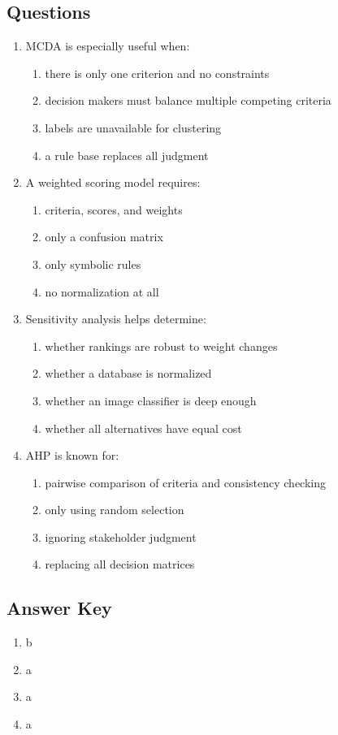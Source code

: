 \subsection*{Questions}
\begin{enumerate}[label=\textbf{Q\arabic*.}]
  \item MCDA is especially useful when:
  \begin{enumerate}[label=\alph*)]
    \item there is only one criterion and no constraints
    \item decision makers must balance multiple competing criteria
    \item labels are unavailable for clustering
    \item a rule base replaces all judgment
  \end{enumerate}

  \item A weighted scoring model requires:
  \begin{enumerate}[label=\alph*)]
    \item criteria, scores, and weights
    \item only a confusion matrix
    \item only symbolic rules
    \item no normalization at all
  \end{enumerate}

  \item Sensitivity analysis helps determine:
  \begin{enumerate}[label=\alph*)]
    \item whether rankings are robust to weight changes
    \item whether a database is normalized
    \item whether an image classifier is deep enough
    \item whether all alternatives have equal cost
  \end{enumerate}

  \item AHP is known for:
  \begin{enumerate}[label=\alph*)]
    \item pairwise comparison of criteria and consistency checking
    \item only using random selection
    \item ignoring stakeholder judgment
    \item replacing all decision matrices
  \end{enumerate}
\end{enumerate}

\subsection*{Answer Key}
\begin{enumerate}[label=\textbf{Q\arabic*.}]
  \item b
  \item a
  \item a
  \item a
\end{enumerate}
